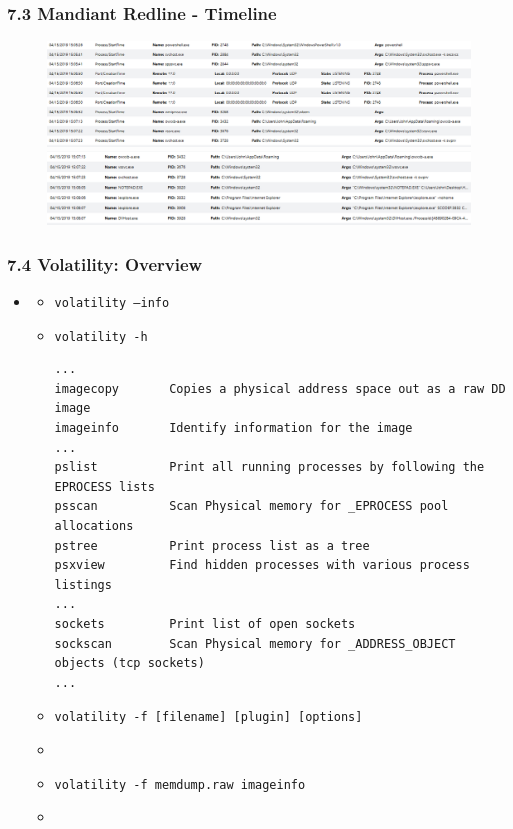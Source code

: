 \begin{frame}
  \frametitle{7.3 Mandiant Redline - Timeline}
  \begin{figure}
    \begin{center}
      \includegraphics[scale=0.37]{images/f12_redline-6.png}

      \vspace{0.2cm}

      \includegraphics[scale=0.4]{images/f12_redline-8.png}
    \end{center}
  \end{figure}
\end{frame}


\begin{frame}[fragile]
  \frametitle{7.4 Volatility: Overview}
    \begin{itemize}
        \item[]
            \begin{itemize}
                \item[] \texttt{volatility --info}
                \item[] \texttt{volatility -h}
                \begin{lstlisting}[basicstyle=\tiny]
...
imagecopy      	Copies a physical address space out as a raw DD image
imageinfo      	Identify information for the image
...
pslist         	Print all running processes by following the EPROCESS lists 
psscan         	Scan Physical memory for _EPROCESS pool allocations
pstree         	Print process list as a tree
psxview        	Find hidden processes with various process listings
...
sockets        	Print list of open sockets
sockscan       	Scan Physical memory for _ADDRESS_OBJECT objects (tcp sockets)
...
                \end{lstlisting}
                \item[] \texttt{volatility -f [filename] [plugin] [options]}
                \item[]
                \item[] \texttt{volatility -f memdump.raw imageinfo}
                \item[]
            \end{itemize}
    \end{itemize}
\end{frame}


